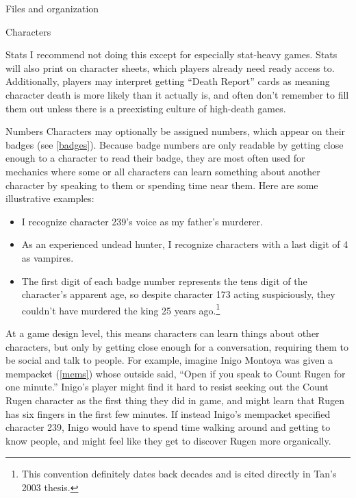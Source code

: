 \documentclass[sheet]{GameTexBase}
\begin{document}
\begin{section}{Files and organization}
\begin{subsection}{Characters}
\begin{subsubsection}{Stats}
I recommend not doing this except for especially stat-heavy games.  Stats will also print on character sheets, which players already need ready access to.  Additionally, players may interpret getting ``Death Report'' cards as meaning character death is more likely than it actually is, and often don't remember to fill them out unless there is a preexisting culture of high-death games.
\end{subsubsection}
\begin{subsubsection}{Numbers}
\label{charnumber}
Characters may optionally be assigned numbers, which appear on their badges (see \ref{badges}). Because badge numbers are only readable by getting close enough to a character to read their badge,
they are most often used for mechanics where some or all characters can learn something about another character by speaking to them or spending time near them.  Here are some illustrative examples:
\begin{itemize}
\item I recognize character 239's voice as my father's murderer.
\item As an experienced undead hunter, I recognize characters with a last digit of 4 as vampires.
\item The first digit of each badge number represents the tens digit of the character's apparent age, so despite character 173 acting suspiciously, they couldn't have murdered the king 25 years ago.\footnote{This convention definitely dates back decades and is cited directly in Tan's 2003 thesis.}
\end{itemize}

At a game design level, this means characters can learn things about other characters, but only by getting close enough for a conversation, requiring them to be social and talk to people.  For example, imagine Inigo Montoya was given a
mempacket (\ref{mems}) whose outside said, ``Open if you speak to Count Rugen for one minute.''  Inigo's player might find it hard to resist seeking out the Count Rugen character as the first thing they did in game, and might learn that Rugen has six fingers in the first few minutes.  If instead Inigo's mempacket specified character 239, Inigo would have to spend time walking around and getting to know people, and might feel like they get to discover Rugen more organically.


\end{subsubsection}
\end{subsection}
\end{section}
\end{document}
